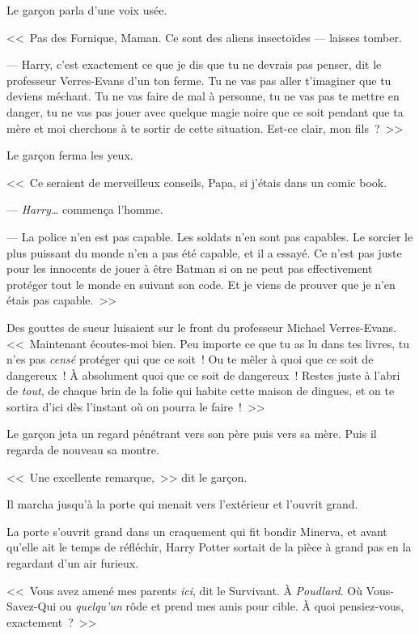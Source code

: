 Le garçon parla d'une voix usée.

<<~Pas des Fornique, Maman. Ce sont des aliens insectoïdes — laisses tomber.

--- Harry, c'est exactement ce que je dis que tu ne devrais pas penser, dit le professeur Verres-Evans d'un ton ferme. Tu ne vas pas aller t'imaginer que tu deviens méchant. Tu ne vas faire de mal à personne, tu ne vas pas te mettre en danger, tu ne vas pas jouer avec quelque magie noire que ce soit pendant que ta mère et moi cherchons à te sortir de cette situation. Est-ce clair, mon fils~?~>>

Le garçon ferma les yeux.

<<~Ce seraient de merveilleux conseils, Papa, si j'étais dans un comic book.

--- \emph{Harry…} commença l'homme.

--- La police n'en est pas capable. Les soldats n'en sont pas capables. Le sorcier le plus puissant du monde n'en a pas été capable, et il a essayé. Ce n'est pas juste pour les innocents de jouer à être Batman si on ne peut pas effectivement protéger tout le monde en suivant son code. Et je viens de prouver que je n'en étais pas capable.~>>

Des gouttes de sueur luisaient sur le front du professeur Michael Verres-Evans. <<~Maintenant écoutes-moi bien. Peu importe ce que tu as lu dans tes livres, tu n'es pas \emph{censé} protéger qui que ce soit~! Ou te mêler à quoi que ce soit de dangereux~! À absolument quoi que ce soit de dangereux~! Restes juste à l'abri de \emph{tout}, de chaque brin de la folie qui habite cette maison de dingues, et on te sortira d'ici dès l'instant où on pourra le faire~!~>>

Le garçon jeta un regard pénétrant vers son père puis vers sa mère. Puis il regarda de nouveau sa montre.

<<~Une excellente remarque,~>> dit le garçon.

Il marcha jusqu'à la porte qui menait vers l'extérieur et l'ouvrit grand.

\later

La porte s'ouvrit grand dans un craquement qui fit bondir Minerva, et avant qu'elle ait le temps de réfléchir, Harry Potter sortait de la pièce à grand pas en la regardant d'un air furieux.

<<~Vous avez amené mes parents \emph{ici}, dit le Survivant. À \emph{Poudlard}. Où Vous-Savez-Qui ou \emph{quelqu'un} rôde et prend mes amis pour cible. À quoi pensiez-vous, exactement~?~>>

